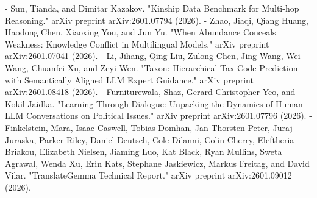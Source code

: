 - Sun, Tianda, and Dimitar Kazakov. "Kinship Data Benchmark for Multi-hop Reasoning." arXiv preprint arXiv:2601.07794 (2026).
- Zhao, Jiaqi, Qiang Huang, Haodong Chen, Xiaoxing You, and Jun Yu. "When Abundance Conceals Weakness: Knowledge Conflict in Multilingual Models." arXiv preprint arXiv:2601.07041 (2026).
- Li, Jihang, Qing Liu, Zulong Chen, Jing Wang, Wei Wang, Chuanfei Xu, and Zeyi Wen. "Taxon: Hierarchical Tax Code Prediction with Semantically Aligned LLM Expert Guidance." arXiv preprint arXiv:2601.08418 (2026).
- Furniturewala, Shaz, Gerard Christopher Yeo, and Kokil Jaidka. "Learning Through Dialogue: Unpacking the Dynamics of Human-LLM Conversations on Political Issues." arXiv preprint arXiv:2601.07796 (2026).
- Finkelstein, Mara, Isaac Caswell, Tobias Domhan, Jan-Thorsten Peter, Juraj Juraska, Parker Riley, Daniel Deutsch, Cole Dilanni, Colin Cherry, Eleftheria Briakou, Elizabeth Nielsen, Jiaming Luo, Kat Black, Ryan Mullins, Sweta Agrawal, Wenda Xu, Erin Kats, Stephane Jaskiewicz, Markus Freitag, and David Vilar. "TranslateGemma Technical Report." arXiv preprint arXiv:2601.09012 (2026). 


